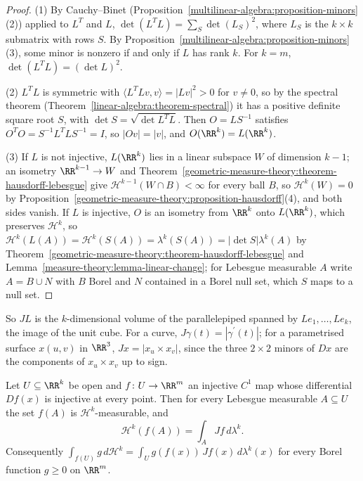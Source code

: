 \begin{proof}
(1) By Cauchy--Binet (Proposition~\ref{multilinear-algebra:proposition-minors}(2)) applied to $L^T$ and $L$, $\det(L^TL) = \sum_S\det(L_{S})^2$, where $L_S$ is the $k \times k$ submatrix with rows
$S$. By Proposition~\ref{multilinear-algebra:proposition-minors}(3), some minor is nonzero if and only if $L$ has rank $k$. For $k = m$, $\det(L^TL) = (\det L)^2$.

(2) $L^TL$ is symmetric with $\langle L^TLv, v\rangle = |Lv|^2 > 0$ for $v \neq 0$, so by the spectral theorem (Theorem~\ref{linear-algebra:theorem-spectral}) it has a positive definite square root $S$,
with $\det S = \sqrt{\det L^TL}$. Then $O = LS^{-1}$ satisfies $O^TO = S^{-1}L^TLS^{-1} = I$, so $|Ov| = |v|$, and $O(\RR^k) = L(\RR^k)$.

(3) If $L$ is not injective, $L(\RR^k)$ lies in a linear subspace $W$ of dimension $k - 1$; an isometry $\RR^{k-1} \to W$ and Theorem~\ref{geometric-measure-theory:theorem-hausdorff-lebesgue} give
$\mathcal{H}^{k-1}(W \cap B) < \infty$ for every ball $B$, so $\mathcal{H}^k(W) = 0$ by Proposition~\ref{geometric-measure-theory:proposition-hausdorff}(4), and both sides vanish. If $L$ is injective, $O$ is an
isometry from $\RR^k$ onto $L(\RR^k)$, which preserves $\mathcal{H}^k$, so $\mathcal{H}^k(L(A)) = \mathcal{H}^k(S(A)) = \lambda^k(S(A)) = |\det S|\lambda^k(A)$ by
Theorem~\ref{geometric-measure-theory:theorem-hausdorff-lebesgue} and Lemma~\ref{measure-theory:lemma-linear-change}; for Lebesgue measurable $A$ write $A = B \cup N$ with $B$ Borel and $N$ contained in a Borel null
set, which $S$ maps to a null set.
\end{proof}

So $JL$ is the $k$-dimensional volume of the parallelepiped spanned by $Le_1, \ldots, Le_k$, the image of the unit cube. For a curve, $J\gamma(t) = |\gamma^{\prime}(t)|$; for a parametrised
surface $x(u, v)$ in $\RR^3$, $Jx = |x_u \times x_v|$, since the three $2 \times 2$ minors of $Dx$ are the components of $x_u \times x_v$ up to sign.

\begin{theorem}\label{geometric-measure-theory:theorem-area-formula}
Let $U \subseteq \RR^k$ be open and $f \colon U \to \RR^m$ an injective $C^1$ map whose differential $Df(x)$ is injective at every point. Then for every Lebesgue measurable $A \subseteq U$ the set
$f(A)$ is $\mathcal{H}^k$-measurable, and
\[
\mathcal{H}^k(f(A)) = \int_AJf\,d\lambda^k .
\]
Consequently $\int_{f(U)}g\,d\mathcal{H}^k = \int_Ug(f(x))\,Jf(x)\,d\lambda^k(x)$ for every Borel function $g \geq 0$ on $\RR^m$.
\end{theorem}

